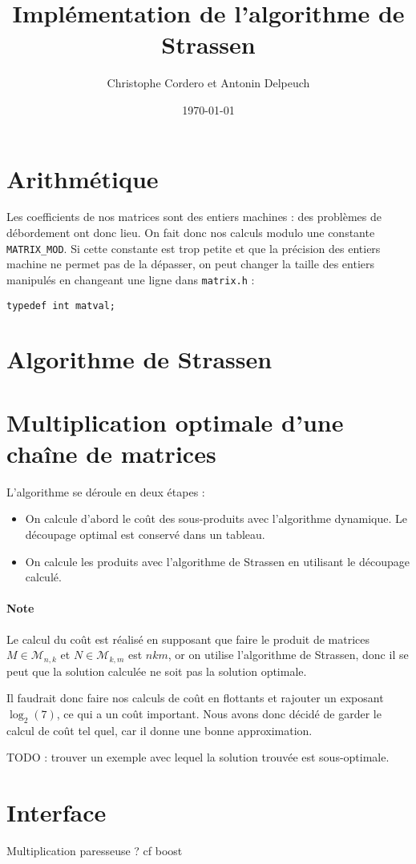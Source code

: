 \documentclass[a4paper]{article}
\begin{document}
\title{Implémentation de l'algorithme de Strassen}
\author{Christophe Cordero et Antonin Delpeuch}
\date{\today}

\maketitle

\section{Arithmétique}

Les coefficients de nos matrices sont des entiers machines : des problèmes de débordement ont donc lieu.
On fait donc nos calculs modulo une constante \texttt{MATRIX_MOD}.
Si cette constante est trop petite et que la précision des entiers machine ne permet pas de la dépasser,
on peut changer la taille des entiers manipulés en changeant une ligne dans \texttt{matrix.h} :
\begin{verbatim}
typedef int matval;
\end{verbatim}

\section{Algorithme de Strassen}


\section{Multiplication optimale d'une chaîne de matrices}

L'algorithme se déroule en deux étapes :
\begin{itemize}
    \item On calcule d'abord le coût des sous-produits avec l'algorithme dynamique.
        Le découpage optimal est conservé dans un tableau.
    \item On calcule les produits avec l'algorithme de Strassen en utilisant le découpage calculé.
\end{itemize}

\paragraph{Note} Le calcul du coût est réalisé en supposant que faire le produit de matrices
$M \in \mathcal{M}_{n,k}$ et $N \in \mathcal{M}_{k,m}$ est $nkm$, or on utilise l'algorithme de Strassen,
donc il se peut que la solution calculée ne soit pas la solution optimale.

Il faudrait donc faire nos calculs de coût en flottants et rajouter un exposant $\log_2(7)$, ce qui a un coût important.
Nous avons donc décidé de garder le calcul de coût tel quel, car il donne une bonne approximation.

TODO : trouver un exemple avec lequel la solution trouvée est sous-optimale.

\section{Interface}

Multiplication paresseuse ?
cf boost
\end{document}
